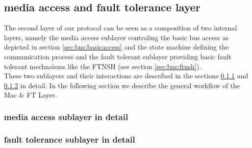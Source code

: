 \subsection{media access and fault tolerance layer}
\label{sec:bus:design:layer2}

The second layer of our protocol can be seen as a composition of two internal layers, namely the media access sublayer controling the basic bus access as depicted in section \ref{sec:bus:basicaccess} and the state machine defining the communication process and the fault tolerant sublayer providing basic fault tolerant mechnaisms like the FTNSH (see section \ref{sec:bus:ftnsh}).\\

These two sublayers and their interactions are described in the sections \ref{sec:bus:design:layer2:mac} and \ref{sec:bus:design:layer2:ft} in detail. In the following section we describe the general workflow of the Mac \& FT Layer.\\

\subsubsection{media access sublayer in detail}
\label{sec:bus:design:layer2:mac}

\subsubsection{fault tolerance sublayer in detail}
\label{sec:bus:design:layer2:ft}


 